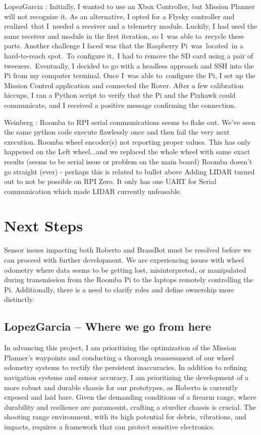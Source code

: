 \documentclass{scrarticle}
\begin{document}
LopezGarcia : Initially, I wanted to use an Xbox Controller, but Mission Planner will not recognize it. As an alternative, I opted for a Flysky controller and realized that I needed a receiver and a telemetry module. Luckily, I had used the same receiver and module in the first iteration, so I was able to recycle these parts. Another challenge I faced was that the Raspberry Pi was located in a hard-to-reach spot. To configure it, I had to remove the SD card using a pair of tweezers. Eventually, I decided to go with a headless approach and SSH into the Pi from my computer terminal. Once I was able to configure the Pi, I set up the Mission Control application and connected the Rover. After a few calibration hiccups, I ran a Python script to verify that the Pi and the Pixhawk could communicate, and I received a positive message confirming the connection.

Weinberg : Roomba to RPI serial communications seems to flake out. We've seen the same python code execute flawlessly once and then fail the very next execution.
Roomba wheel encoder(s) not reporting proper values. This has only happened on the Left wheel...and we replaced the whole wheel with same exact results (seems to be serial issue or problem on the main board)
Roomba doesn't go straight (ever) - perhaps this is related to bullet above
Adding LIDAR turned out to not be possible on RPI Zero. It only has one UART for Serial communication which made LIDAR currently unfeasable. 

\section{Next Steps}
Sensor issues impacting both Roberto and BrassBot must be resolved before we can proceed with further development. We are experiencing issues with wheel odometry where data seems to be getting lost, misinterpreted, or manipulated during transmission from the Roomba Pi to the laptops remotely controlling the Pi. Additionally, there is a need to clarify roles and define ownership more distinctly.

\subsection{LopezGarcia -- Where we go from here}
In advancing this project, I am prioritizing the optimization of the Mission Planner's waypoints and conducting a thorough reassessment of our wheel odometry systems to rectify the persistent inaccuracies.
In addition to refining navigation systems and sensor accuracy, I am prioritizing the development of a more robust and durable chassis for our prototypes, as Roberto is currently exposed and laid bare. Given the demanding conditions of a firearm range, where durability and resilience are paramount, crafting a sturdier chassis is crucial. The shooting range environment, with its high potential for debris, vibrations, and impacts, requires a framework that can protect sensitive electronics.
\end{document}
